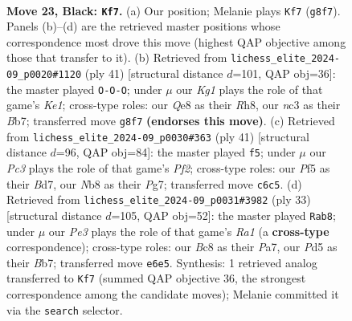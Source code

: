 \documentclass[11pt]{article}
\begin{document}
\clearpage

\begin{figure}[p]\centering
\begin{subfigure}{0.46\textwidth}\centering
\resizebox{\linewidth}{!}{%
\newchessgame
\chessboard[
  setfen={rnb1qrk1/1p6/2p1p3/p2p1p1p/Pn1P1P2/2N2NP1/1PPQ1K1P/3R1B1R b - - 0 23},
  showmover=false,
  pgfstyle=straightmove, color=movearrow, markmove={g8-f7}
]}
\caption{}
\end{subfigure}\hfill
\begin{subfigure}{0.46\textwidth}\centering
\resizebox{\linewidth}{!}{%
\newchessgame
\chessboard[
  setfen={r3k2r/1bqnppb1/pp1p3p/2pP4/P1P1PP2/2N1B1NP/1P1Q2K1/R3R3 b kq - 0 21},
  showmover=false,
  pgfstyle=straightmove, color=movearrow, markmove={e8-c8}
]}
\caption{}
\end{subfigure}
\\[4pt]
\begin{subfigure}{0.46\textwidth}\centering
\resizebox{\linewidth}{!}{%
\newchessgame
\chessboard[
  setfen={1r3rk1/3b1pp1/1q2p2p/2npP3/pn1N1P2/2N1Q2P/1PPRB1PK/5R2 b - - 1 21},
  showmover=false,
  pgfstyle=straightmove, color=movearrow, markmove={f7-f5}
]}
\caption{}
\end{subfigure}\hfill
\begin{subfigure}{0.46\textwidth}\centering
\resizebox{\linewidth}{!}{%
\newchessgame
\chessboard[
  setfen={r2r2k1/pb2qppp/2p1pnn1/2Pp4/8/2NPP1P1/PQ3PBP/2R1NRK1 b - - 0 17},
  showmover=false,
  pgfstyle=straightmove, color=movearrow, markmove={a8-b8}
]}
\caption{}
\end{subfigure}
\caption{\textbf{Move 23, Black: \texttt{Kf7}.} (a) Our position; Melanie plays \texttt{Kf7} (\texttt{g8f7}). Panels (b)--(d) are the retrieved master positions whose correspondence most drove this move (highest QAP objective among those that transfer to it). (b) Retrieved from \texttt{lichess\_elite\_2024-09\_p0020\#1120} (ply 41) [structural distance $d$=101, QAP obj=36]: the master played \texttt{O-O-O}; under $\mu$ our \emph{Kg1} plays the role of that game's \emph{Ke1}; cross-type roles: our \emph{Q}e8 as their \emph{R}h8, our \emph{n}c3 as their \emph{B}b7; transferred move \texttt{g8f7} \textbf{(endorses this move)}. (c) Retrieved from \texttt{lichess\_elite\_2024-09\_p0030\#363} (ply 41) [structural distance $d$=96, QAP obj=84]: the master played \texttt{f5}; under $\mu$ our \emph{Pc3} plays the role of that game's \emph{Pf2}; cross-type roles: our \emph{P}f5 as their \emph{B}d7, our \emph{N}b8 as their \emph{P}g7; transferred move \texttt{c6c5}. (d) Retrieved from \texttt{lichess\_elite\_2024-09\_p0031\#3982} (ply 33) [structural distance $d$=105, QAP obj=52]: the master played \texttt{Rab8}; under $\mu$ our \emph{Pe3} plays the role of that game's \emph{Ra1} (a \textbf{cross-type} correspondence); cross-type roles: our \emph{B}c8 as their \emph{P}a7, our \emph{P}d5 as their \emph{B}b7; transferred move \texttt{e6e5}. Synthesis: 1 retrieved analog transferred to \texttt{Kf7} (summed QAP objective 36, the strongest correspondence among the candidate moves); Melanie committed it via the \texttt{search} selector.}
\label{fig:thought-m45}
\end{figure}
\end{document}
